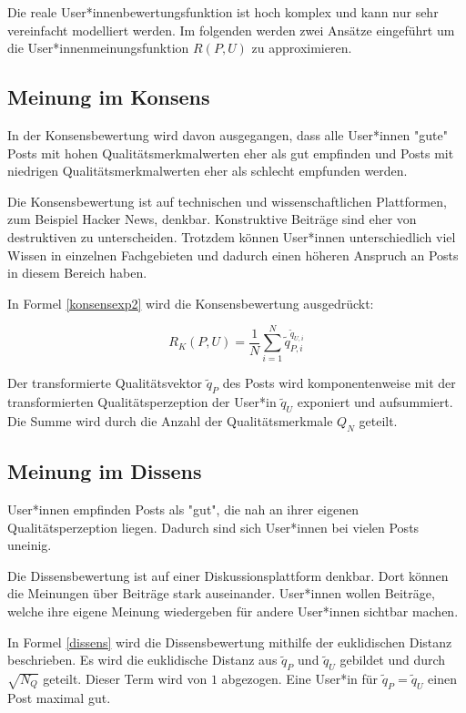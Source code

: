 Die reale User*innenbewertungsfunktion ist hoch komplex und kann nur sehr vereinfacht modelliert werden.
Im folgenden werden zwei Ansätze eingeführt um die User*innenmeinungsfunktion $R(P,U)$ zu approximieren.
 
\subsection{Meinung im Konsens}

In der Konsensbewertung wird davon ausgegangen, dass alle User*innen "gute" Posts mit hohen Qualitätsmerkmalwerten eher als gut empfinden und Posts mit niedrigen Qualitätsmerkmalwerten eher als schlecht empfunden werden.

Die Konsensbewertung ist auf technischen und wissenschaftlichen Plattformen, zum Beispiel Hacker News, denkbar. Konstruktive Beiträge sind eher von destruktiven zu unterscheiden. Trotzdem können User*innen unterschiedlich viel Wissen in einzelnen Fachgebieten und dadurch einen höheren Anspruch an Posts in diesem Bereich haben.  

In Formel \ref{konsensexp2} wird die Konsensbewertung ausgedrückt: 

\begin{equation}
\label{konsensexp2}
R_K(P,U) = \frac{1}{N}\sum_{i = 1}^{N}\tilde{q}_{P,i}^{\tilde{q}_{U,i}}
\end{equation}

Der transformierte Qualitätsvektor $\tilde{q}_P$ des Posts wird komponentenweise mit der transformierten Qualitätsperzeption der User*in $\tilde{q}_U$ exponiert und aufsummiert. Die Summe wird durch die Anzahl der Qualitätsmerkmale $Q_N$ geteilt.


\subsection{Meinung im Dissens}

User*innen empfinden Posts als "gut", die nah an ihrer eigenen Qualitätsperzeption liegen. Dadurch sind sich User*innen bei vielen Posts uneinig.


Die Dissensbewertung ist auf einer Diskussionsplattform denkbar. Dort können die Meinungen über Beiträge stark auseinander. User*innen wollen Beiträge, welche ihre eigene Meinung wiedergeben für andere User*innen sichtbar machen.



In Formel \ref{dissens} wird die Dissensbewertung mithilfe der euklidischen Distanz beschrieben. Es wird die euklidische Distanz aus $\tilde{q}_P$ und $\tilde{q}_U$ gebildet und durch $\sqrt{N_Q}$ geteilt. Dieser Term wird von $1$ abgezogen. Eine User*in für $\tilde{q}_P = \tilde{q}_U$ einen Post maximal gut.


